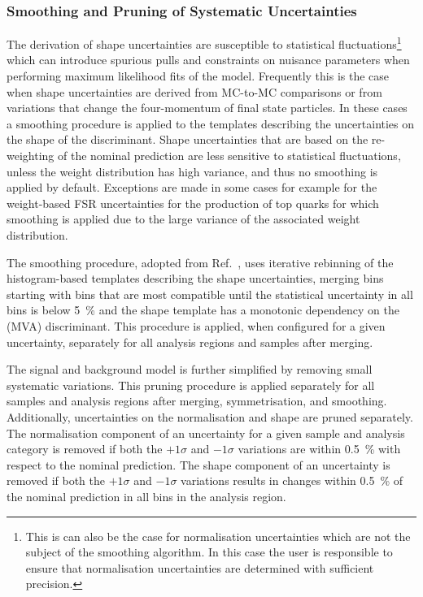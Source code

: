 \subsubsection{Smoothing and Pruning of Systematic Uncertainties}

The derivation of shape uncertainties are susceptible to statistical
fluctuations\footnote{This is can also be the case for normalisation
  uncertainties which are not the subject of the smoothing
  algorithm. In this case the user is responsible to ensure that
  normalisation uncertainties are determined with sufficient
  precision.} which can introduce spurious pulls and constraints on
nuisance parameters when performing maximum likelihood fits of the
model. Frequently this is the case when shape uncertainties are
derived from MC-to-MC comparisons or from variations that change the
four-momentum of final state particles. In these cases a smoothing
procedure is applied to the templates describing the uncertainties on
the shape of the discriminant. Shape uncertainties that are based on
the re-weighting of the nominal prediction are less sensitive to
statistical fluctuations, unless the weight distribution has high
variance, and thus no smoothing is applied by default. Exceptions are
made in some cases for example for the weight-based FSR uncertainties
for the production of top quarks for which smoothing is applied due to
the large variance of the associated weight distribution.

The smoothing procedure, adopted from Ref.~\cite{HIGG-2013-23}, uses
iterative rebinning of the histogram-based templates describing the
shape uncertainties, merging bins starting with bins that are most
compatible until the statistical uncertainty in all bins is below
\SI{5}{\percent} and the shape template has a monotonic
dependency on the (MVA) discriminant. This procedure is
applied, when configured for a given uncertainty, separately for all
analysis regions and samples after merging.

The signal and background model is further simplified by removing
small systematic variations. This pruning procedure is applied
separately for all samples and analysis regions after merging,
symmetrisation, and smoothing. Additionally, uncertainties on the
normalisation and shape are pruned separately. The normalisation
component of an uncertainty for a given sample and analysis category
is removed if both the $+1\sigma$ and $-1\sigma$ variations are within
\SI{0.5}{\percent} with respect to the nominal prediction. The shape
component of an uncertainty is removed if both the $+1\sigma$ and
$-1\sigma$ variations results in changes within \SI{0.5}{\percent} of
the nominal prediction in all bins in the analysis region.


